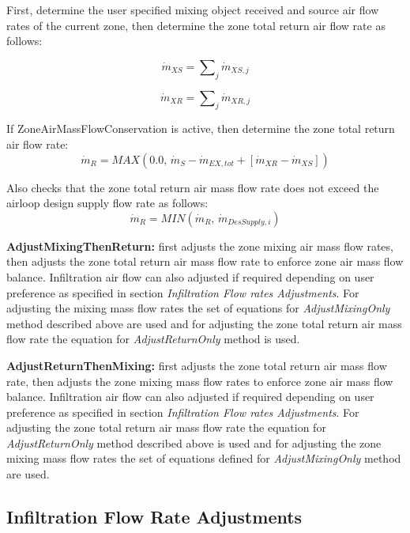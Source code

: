 First, determine the user specified mixing object received and source air flow rates of the current zone, then determine the zone total return air flow rate as follows:

\begin{equation}
{\dot m_{XS}} = \sum\nolimits_j {{{\dot m}_{XS,j}}}
\end{equation}

\begin{equation}
{\dot m_{XR}} = \sum\nolimits_j {{{\dot m}_{XR,j}}}
\end{equation}

If ZoneAirMassFlowConservation is active, then determine the zone total return air flow rate:
\begin{equation}
{\dot m_{R}} = MAX\left( {0.0,\,{{\dot m}_S} - {{\dot m}_{EX,tot}} + [{{\dot m}_{XR}} - {{\dot m}_{XS}}]} \right)
\end{equation}

Also checks that the zone total return air mass flow rate does not exceed the airloop design supply flow rate as follows:
\begin{equation}
{\dot m_{R}} = MIN\left( {{\dot m_{R}},\,{{\dot m}_{DesSupply,i}}} \right)
\end{equation}

\textbf{AdjustMixingThenReturn:} first adjusts the zone mixing air mass flow rates, then adjusts the zone total return air mass flow rate to enforce zone air mass flow balance. Infiltration air flow can also adjusted if required depending on user preference as specified in section \textit{Infiltration Flow rates Adjustments}. For adjusting the mixing mass flow rates the set of equations for \textit{AdjustMixingOnly} method described above are used and for adjusting the zone total return air mass flow rate the equation for \textit{AdjustReturnOnly} method is used.

\textbf{AdjustReturnThenMixing:} first adjusts the zone total return air mass flow rate, then adjusts the zone mixing mass flow rates to enforce zone air mass flow balance. Infiltration air flow can also adjusted if required depending on user preference as specified in section \textit{Infiltration Flow rates Adjustments}. For adjusting the zone total return air mass flow rate the equation for \textit{AdjustReturnOnly} method described above is used and for adjusting the zone mixing mass flow rates the set of equations defined for \textit{AdjustMixingOnly} method are used.

\subsection{Infiltration Flow Rate Adjustments}\label{infiltration-flow-rate-adjustments}

